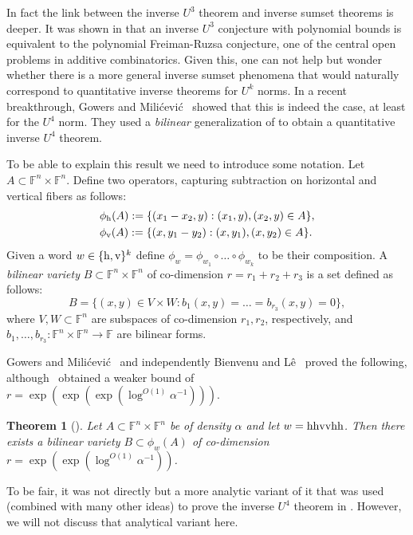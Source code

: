 \documentclass[12pt]{article}
\newcommand{\F}{\mathbb{F}}
\newcommand{\hr}{\textup{h}}
\newcommand{\vr}{\textup{v}}
\newtheorem{theorem}{Theorem}[section]
\begin{document}
In fact the link between the inverse $U^3$ theorem and inverse sumset theorems is deeper. It was shown in \cite{green2010equivalence,lovett2012equivalence} that an inverse $U^3$ conjecture with polynomial bounds is equivalent to the polynomial Freiman-Ruzsa conjecture, one of the central open problems in additive combinatorics.
Given this, one can not help but wonder whether there is a more general inverse sumset phenomena that would naturally correspond to quantitative inverse theorems for $U^k$ norms. In a recent breakthrough, Gowers and Mili\'cevi\'c~\cite{gowers2017quantitative} showed that this is indeed the case, at least for the $U^4$ norm. They used a \textit{bilinear} generalization of  to obtain a quantitative inverse $U^4$ theorem.

To be able to explain this result we need to introduce some notation. Let $A \subset \F^n \times \F^n$. Define two operators, capturing subtraction on horizontal and vertical fibers as follows:
\begin{align*}
&\phi_\hr(A) := \{(x_1-x_2, y): (x_1,y),(x_2,y) \in A\},\\
&\phi_\vr(A) := \{(x, y_1-y_2): (x,y_1),(x,y_2) \in A\}.
\end{align*}
Given a word $w \in \{\hr,\vr\}^k$ define $\phi_w = \phi_{w_1} \circ \ldots \circ \phi_{w_k}$ to be their composition.
A \emph{bilinear variety} $B \subset \F^n \times \F^n$ of co-dimension $r=r_1+r_2+r_3$ is a set defined as follows:
$$
B = \{(x,y) \in V \times W: b_1(x,y)=\ldots=b_{r_3}(x,y)=0\},
$$
where $V, W \subset \F^n$ are subspaces of co-dimension $r_1,r_2$, respectively,
and $b_1,\ldots,b_{r_3}:\F^n \times \F^n \to \F$ are bilinear forms.

Gowers and Mili\'cevi\'c~\cite{gowers2017bilinear} and independently Bienvenu and L\^e~\cite{bienvenu2017bilinear} proved the following, although~\cite{bienvenu2017bilinear} obtained a weaker bound of $r = \exp(\exp(\exp(\log^{O(1)}\alpha^{-1})))$.


\begin{theorem}[\cite{gowers2017bilinear,bienvenu2017bilinear}]
\label{theorem:gowersbilinear}
Let $A \subset \F^n \times \F^n$ be of density $\alpha$ and let $w = \hr\hr\vr\vr\hr\hr$. Then there exists a bilinear variety $B \subset \phi_w(A)$
of co-dimension $r=\exp(\exp(\log^{O(1)}\alpha^{-1}))$.
\end{theorem}

To be fair, it was not  directly but a more analytic variant of it that was used (combined with many other ideas) to prove the inverse $U^4$ theorem in \cite{gowers2017quantitative}. However, we will not discuss that analytical variant here.
\end{document}
